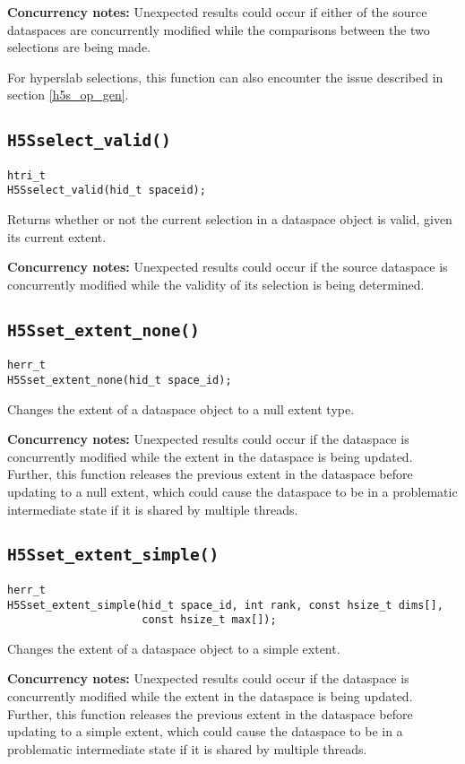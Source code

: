 \documentclass[../HDF5_RFC.tex]{subfiles}
\begin{document}
\textbf{Concurrency notes:} Unexpected results could occur if either of the source dataspaces are
concurrently modified while the comparisons between the two selections are being made.

For hyperslab selections, this function can also encounter the issue described in section
\ref{h5s_op_gen}.

\subsection{\texttt{H5Sselect\_valid()}}
\label{apdx:h5s_func_h5sselect_valid}

\begin{verbatim}
htri_t
H5Sselect_valid(hid_t spaceid);
\end{verbatim}

Returns whether or not the current selection in a dataspace object is valid, given its current extent.

\textbf{Concurrency notes:} Unexpected results could occur if the source dataspace is concurrently
modified while the validity of its selection is being determined.

\subsection{\texttt{H5Sset\_extent\_none()}}
\label{apdx:h5s_func_h5sset_extent_none}

\begin{verbatim}
herr_t
H5Sset_extent_none(hid_t space_id);
\end{verbatim}

Changes the extent of a dataspace object to a null extent type.

\textbf{Concurrency notes:} Unexpected results could occur if the dataspace is concurrently
modified while the extent in the dataspace is being updated. Further, this function releases
the previous extent in the dataspace before updating to a null extent, which could cause the
dataspace to be in a problematic intermediate state if it is shared by multiple threads.

\subsection{\texttt{H5Sset\_extent\_simple()}}
\label{apdx:h5s_func_h5sset_extent_simple}

\begin{verbatim}
herr_t
H5Sset_extent_simple(hid_t space_id, int rank, const hsize_t dims[],
                     const hsize_t max[]);
\end{verbatim}

Changes the extent of a dataspace object to a simple extent.

\textbf{Concurrency notes:} Unexpected results could occur if the dataspace is concurrently
modified while the extent in the dataspace is being updated. Further, this function releases
the previous extent in the dataspace before updating to a simple extent, which could cause the
dataspace to be in a problematic intermediate state if it is shared by multiple threads.
\end{document}
